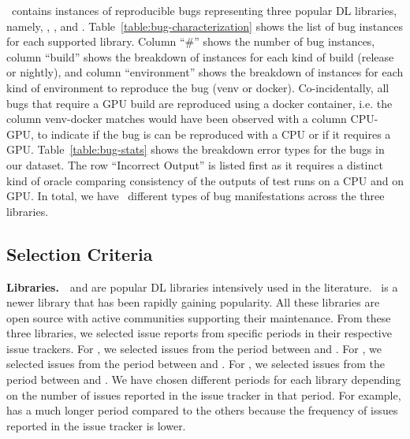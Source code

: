 \documentclass[sigconf,screen]{acmart}
\begin{document}
\tname\ contains \numbugs{} instances of reproducible bugs
representing three popular DL libraries, namely, \jax, \tf, and
\torch. Table~\ref{table:bug-characterization} shows the list of bug
instances for each supported library. Column ``\#'' shows the number
of bug instances, column ``build'' shows the breakdown of instances
for each kind of build (release or nightly), and column
``environment'' shows the breakdown of instances for each kind of
environment to reproduce the bug (venv or docker). Co-incidentally,
all bugs that require a GPU build are reproduced using a docker
container, i.e. the column venv-docker matches would have been
observed with a column CPU-GPU, to indicate if the bug is can be
reproduced with a CPU or if it requires a
GPU. Table~\ref{table:bug-stats} shows the breakdown error types for
the bugs in our dataset. The row ``Incorrect Output'' is listed first
as it requires a distinct kind of oracle comparing consistency of the
outputs of test runs on a CPU and on GPU. In total, we have
\numbugtypes\ different types of bug manifestations across the three
libraries.

\subsection{Selection Criteria}
\label{sec:selection-criterion}


\textbf{Libraries.}~\torch~and \tf are popular DL libraries
intensively used in the literature. \jax\ is a newer library that has
been rapidly gaining popularity. All these libraries are open source
with active communities supporting their maintenance. From these three
libraries, we selected issue reports from specific periods in their
respective issue trackers. For \torch, we selected issues from the
period between \torchfrom and \torchto. For \tf, we selected issues
from the period between \tffrom and \tfto. For \jax, we selected
issues from the period between \jaxfrom and \jaxto. We have chosen
different periods for each library depending on the number of issues
reported in the issue tracker in that period. For example, \tf has a
much longer period compared to the others because the frequency of
issues reported in the issue tracker is lower.


\end{document}
